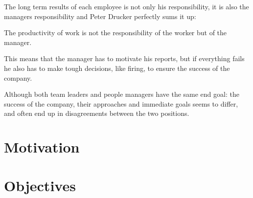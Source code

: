 The long term results of each employee is not only his responsibility, it is also the managers responsibility and Peter Drucker perfectly sums it up:
\begin{displayquote}
The productivity of work is not the responsibility of the worker but of the manager.
\end{displayquote}
This means that the manager has to motivate his reports, but if everything fails he also has to make tough decisions, like firing, to ensure the success of the company.

Although both team leaders and people managers have the same end goal: the success of the company, their approaches and immediate goals seems to differ, and often end up in disagreements between the two positions.
 
\section{Motivation}
\label{sec:motivation}

\section{Objectives}
\label{sec:Objectives}
